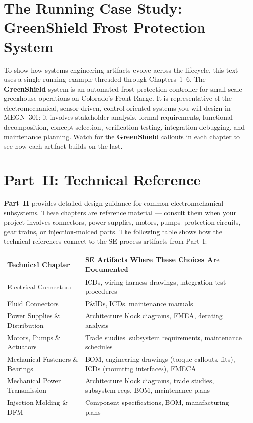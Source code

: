 \documentclass[11pt,letterpaper,twoside,openany]{book}
\begin{document}
\section*{The Running Case Study: GreenShield Frost Protection System}

To show how systems engineering artifacts evolve across the lifecycle, this text uses a single running example threaded through Chapters~1--6. The \textbf{GreenShield} system is an automated frost protection controller for small-scale greenhouse operations on Colorado's Front Range. It is representative of the electromechanical, sensor-driven, control-oriented systems you will design in MEGN~301: it involves stakeholder analysis, formal requirements, functional decomposition, concept selection, verification testing, integration debugging, and maintenance planning. Watch for the \textbf{GreenShield} callouts in each chapter to see how each artifact builds on the last.

\section*{Part~II: Technical Reference}

\textbf{Part~II} provides detailed design guidance for common electromechanical subsystems. These chapters are reference material --- consult them when your project involves connectors, power supplies, motors, pumps, protection circuits, gear trains, or injection-molded parts. The following table shows how the technical references connect to the SE process artifacts from Part~I:

\begin{center}
\small
\begin{tabularx}{\textwidth}{l X}
\toprule
\textbf{Technical Chapter} & \textbf{SE Artifacts Where These Choices Are Documented} \\
\midrule
Electrical Connectors & ICDs, wiring harness drawings, integration test procedures \\
Fluid Connectors & P\&IDs, ICDs, maintenance manuals \\
Power Supplies \& Distribution & Architecture block diagrams, FMEA, derating analysis \\
Motors, Pumps \& Actuators & Trade studies, subsystem requirements, maintenance schedules \\
Mechanical Fasteners \& Bearings & BOM, engineering drawings (torque callouts, fits), ICDs (mounting interfaces), FMECA \\
Mechanical Power Transmission & Architecture block diagrams, trade studies, subsystem reqs, BOM, maintenance plans \\
Injection Molding \& DFM & Component specifications, BOM, manufacturing plans \\
\bottomrule
\end{tabularx}
\end{center}
\end{document}
